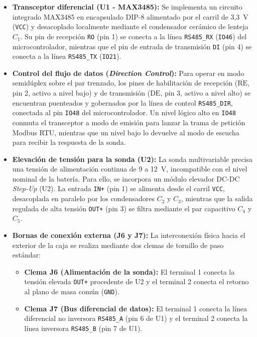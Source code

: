 \begin{itemize}
    \item \textbf{Transceptor diferencial (U1 - MAX3485):} Se implementa un circuito integrado MAX3485 en encapsulado DIP-8 alimentado por el carril de 3,3~V (\texttt{VCC}) y desacoplado localmente mediante el condensador cerámico de lenteja $C_1$. Su pin de recepción \texttt{RO} (pin 1) se conecta a la línea \texttt{RS485\_RX} (\texttt{IO46}) del microcontrolador, mientras que el pin de entrada de transmisión \texttt{DI} (pin 4) se conecta a la línea \texttt{RS485\_TX} (\texttt{IO21}).
    \item \textbf{Control del flujo de datos (\textit{Direction Control}):} Para operar en modo semidúplex sobre el par trenzado, los pines de habilitación de recepción ($\overline{\text{RE}}$, pin 2, activo a nivel bajo) y de transmisión ($\text{DE}$, pin 3, activo a nivel alto) se encuentran puenteados y gobernados por la línea de control \texttt{RS485\_DIR}, conectada al pin \texttt{IO48} del microcontrolador. Un nivel lógico alto en \texttt{IO48} conmuta el transceptor a modo de emisión para lanzar la trama de petición Modbus RTU, mientras que un nivel bajo lo devuelve al modo de escucha para recibir la respuesta de la sonda.
    \item \textbf{Elevación de tensión para la sonda (U2):} La sonda multivariable precisa una tensión de alimentación continua de 9 a 12~V, incompatible con el nivel nominal de la batería. Para ello, se incorpora un módulo elevador DC-DC \textit{Step-Up} (U2). La entrada \texttt{IN+} (pin 1) se alimenta desde el carril \texttt{VCC}, desacoplada en paralelo por los condensadores $C_2$ y $C_3$, mientras que la salida regulada de alta tensión \texttt{OUT+} (pin 3) se filtra mediante el par capacitivo $C_4$ y $C_5$.
    \item \textbf{Bornas de conexión externa (J6 y J7):} La interconexión física hacia el exterior de la caja se realiza mediante dos clemas de tornillo de paso estándar:
    \begin{itemize}
        \item \textbf{Clema J6 (Alimentación de la sonda):} El terminal 1 conecta la tensión elevada \texttt{OUT+} procedente de U2 y el terminal 2 conecta el retorno al plano de masa común (\texttt{GND}).
        \item \textbf{Clema J7 (Bus diferencial de datos):} El terminal 1 conecta la línea diferencial no inversora \texttt{RS485\_A} (pin 6 de U1) y el terminal 2 conecta la línea inversora \texttt{RS485\_B} (pin 7 de U1).
    \end{itemize}
\end{itemize}

